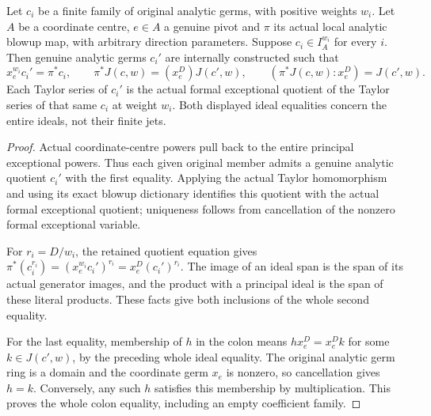 \begin{theorem}
\label{hir:actual-weighted-coefficient-compression-transform}
\leanok
Let $c_i$ be a finite family of original analytic germs, with positive weights $w_i$.
Let $A$ be a coordinate centre, $e\in A$ a genuine pivot and $\pi$ its actual local
analytic blowup map, with arbitrary direction parameters. Suppose
$c_i\in I_A^{w_i}$ for every $i$. Then genuine analytic germs $c_i'$ are internally
constructed such that
\[
 x_e^{w_i}c_i'=\pi^*c_i,\qquad
 \pi^*J(c,w)=(x_e^D)J(c',w),\qquad
 (\pi^*J(c,w):x_e^D)=J(c',w).
\]
Each Taylor series of $c_i'$ is the actual formal exceptional quotient of the
Taylor series of that same $c_i$ at weight $w_i$.
Both displayed ideal equalities concern the entire ideals, not their finite jets.
\end{theorem}
\begin{proof}
Actual coordinate-centre powers pull back to the entire principal exceptional
powers. Thus each given original member admits a genuine analytic quotient
$c_i'$ with the first equality. Applying the actual Taylor homomorphism and
using its exact blowup dictionary identifies this quotient with the actual
formal exceptional quotient; uniqueness follows from cancellation of the
nonzero formal exceptional variable.

For $r_i=D/w_i$, the retained quotient equation gives
$\pi^*(c_i^{r_i})=(x_e^{w_i}c_i')^{r_i}=x_e^D(c_i')^{r_i}$.
The image of an ideal span is the span of its actual generator images, and the
product with a principal ideal is the span of these literal products. These
facts give both inclusions of the whole second equality.

For the last equality, membership of $h$ in the colon means
$h x_e^D=x_e^D k$ for some $k\in J(c',w)$, by the preceding whole ideal equality.
The original analytic germ ring is a domain and the coordinate germ $x_e$ is
nonzero, so cancellation gives $h=k$. Conversely, any such $h$ satisfies this
membership by multiplication. This proves the whole colon equality, including
an empty coefficient family.
\end{proof}

